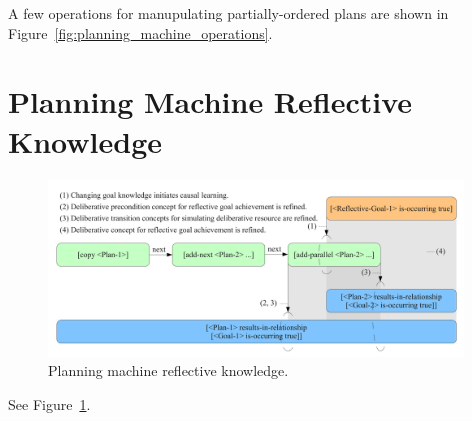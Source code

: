 A few operations for manupulating partially-ordered plans are shown in
Figure~\ref{fig:planning_machine_operations}.


\section{Planning Machine Reflective Knowledge}

\begin{figure}[bth]
  \center
  \includegraphics[width=11cm]{gfx/planning_machine_reflective_knowledge}
  \caption[Planning machine reflective knowledge.]{Planning machine reflective knowledge.}
  \label{fig:planning_machine_reflective_knowledge}
\end{figure}

See Figure~\ref{fig:planning_machine_reflective_knowledge}.

